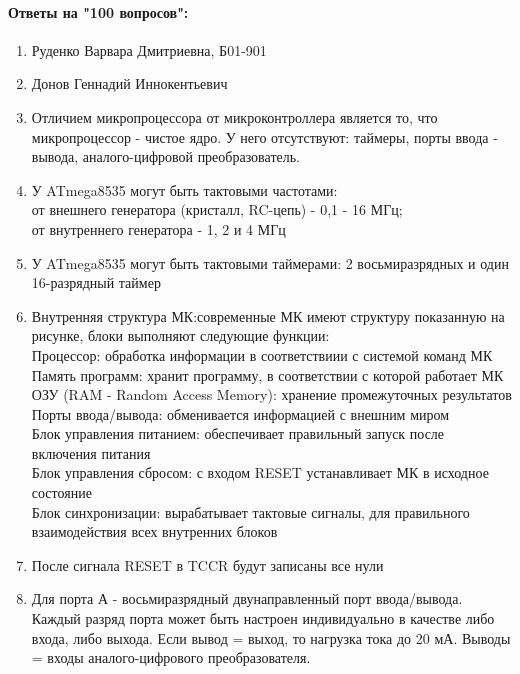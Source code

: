 \documentclass{article}
\begin{document}
\paragraph{Ответы на "100 вопросов":}
	\begin{enumerate}
		\item Руденко Варвара Дмитриевна, Б01-901
		\item Донов Геннадий Иннокентьевич
		\item Отличием микропроцессора от микроконтроллера является то, что микропроцессор - чистое ядро. У него отсутствуют: таймеры, порты ввода - вывода, аналого-цифровой преобразователь.
		\item У ATmega8535 могут быть тактовыми частотами:\\ от внешнего генератора (кристалл, RC-цепь) - 0,1 - 16 МГц; \\ от внутреннего генератора - 1, 2 и 4 МГц
		\item У ATmega8535 могут быть тактовыми таймерами: 2 восьмиразрядных и один 16-разрядный таймер
		\item Внутренняя структура МК:современные МК имеют структуру показанную на рисунке, блоки выполняют следующие функции:\\
		Процессор: обработка информации в соответствиии с системой команд МК\\
		Память программ: хранит программу, в соответствии с которой работает МК\\
		ОЗУ (RAM - Random Access Memory): хранение промежуточных результатов\\
		Порты ввода/вывода: обменивается информацией с внешним миром\\
		Блок управления питанием: обеспечивает правильный запуск после включения питания\\
		Блок управления сбросом: с входом RESET устанавливает МК в исходное состояние\\
		Блок синхронизации: вырабатывает тактовые сигналы, для правильного взаимодействия всех внутренних блоков
		\begin{figure}[h!]
		\end{figure}
\newpage
		\item После сигнала RESET в TCCR будут записаны все нули
		\item Для порта А - восьмиразрядный двунаправленный порт ввода/вывода. Каждый разряд порта может быть настроен индивидуально в качестве либо входа, либо выхода. Если вывод = выход, то нагрузка тока до 20 мА. Выводы = входы аналого-цифрового преобразователя.

\end{enumerate}
\end{document}
